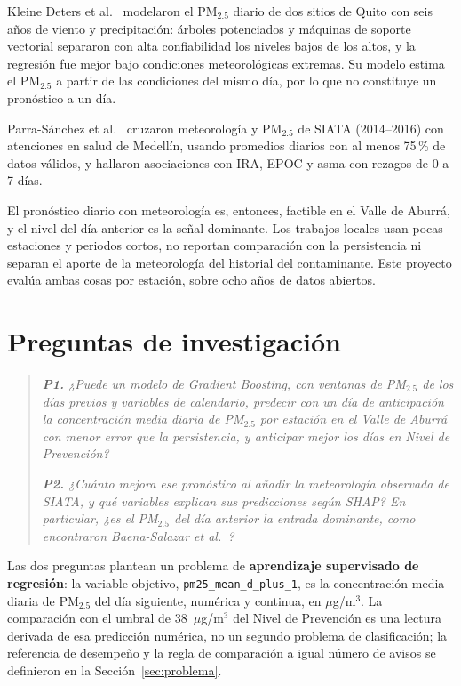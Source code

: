 \documentclass[conference]{IEEEtran}
\begin{document}
Kleine Deters et al.\ \cite{kleine2017modeling} modelaron el PM$_{2.5}$
diario de dos sitios de Quito con seis años de viento y precipitación:
árboles potenciados y máquinas de soporte vectorial separaron con alta
confiabilidad los niveles bajos de los altos, y la regresión fue mejor bajo
condiciones meteorológicas extremas. Su modelo estima el PM$_{2.5}$ a partir
de las condiciones del mismo día, por lo que no constituye un pronóstico a un
día.

Parra-Sánchez et al.\ \cite{parra2020analitica} cruzaron meteorología y
PM$_{2.5}$ de SIATA (2014--2016) con atenciones en salud de Medellín, usando
promedios diarios con al menos 75\,\% de datos válidos, y hallaron
asociaciones con IRA, EPOC y asma con rezagos de 0 a 7 días.

El pronóstico diario con meteorología es, entonces, factible en el Valle de
Aburrá, y el nivel del día anterior es la señal dominante. Los trabajos
locales usan pocas estaciones y periodos cortos, no reportan comparación con
la persistencia ni separan el aporte de la meteorología del historial del
contaminante. Este proyecto evalúa ambas cosas por estación, sobre ocho años
de datos abiertos.


\section{Preguntas de investigación}
\label{sec:pregunta}

\begin{quote}
\textit{\textbf{P1.} ¿Puede un modelo de Gradient Boosting, con ventanas de
PM$_{2.5}$ de los días previos y variables de calendario, predecir con un
día de anticipación la concentración media diaria de PM$_{2.5}$ por
estación en el Valle de Aburrá con menor error que la persistencia, y
anticipar mejor los días en Nivel de Prevención?}

\textit{\textbf{P2.} ¿Cuánto mejora ese pronóstico al añadir la
meteorología observada de SIATA, y qué variables explican sus predicciones
según SHAP? En particular, ¿es el PM$_{2.5}$ del día anterior la entrada
dominante, como encontraron Baena-Salazar et al.\ \cite{baena2019red}?}
\end{quote}

Las dos preguntas plantean un problema de \textbf{aprendizaje supervisado de
regresión}: la variable objetivo, \texttt{pm25\_mean\_d\_plus\_1}, es la
concentración media diaria de PM$_{2.5}$ del día siguiente, numérica y
continua, en $\mu$g/m$^3$. La comparación con el umbral de 38~$\mu$g/m$^3$
del Nivel de Prevención es una lectura derivada de esa predicción numérica,
no un segundo problema de clasificación; la referencia de desempeño y la
regla de comparación a igual número de avisos se definieron en la
Sección~\ref{sec:problema}.
\end{document}
